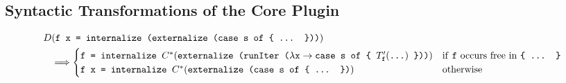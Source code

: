 \documentclass[sigplan,anonymous,review]{acmart}
\newcommand{\expr}[1]{(#1)} %
\newcommand{\rarr}{\rightarrow}
\newcommand{\rewrites}{\Longrightarrow}
\newcommand{\tdots}{\ttt{...}}
\newcommand{\exprdots}{\expr{\tdots}}
\newcommand{\ttt}{\texttt}
\newenvironment{todo}
  {\begin{tcolorbox}
   \textbf{TODO}:
  }
  {\end{tcolorbox}
  }
\begin{document}
\clearpage
\subsection{Syntactic Transformations of the Core Plugin}


\begin{align*}
  D&\expr{\ttt{f x = internalize (externalize (case s of \{ ... \}))}}\\
      &\rewrites \begin{cases}
        \ttt{f = internalize $C^{*}\expr{\ttt{externalize (runIter ($\lambda \ttt{x} \rarr \ttt{case s of \{ $T'_{\ttt{f}}\exprdots$}$ \}))}}$} & \text{if \ttt{f} occurs free in \ttt{\{ ... \}}}\\
        \ttt{f x = internalize $C^{*}\expr{\ttt{externalize (case s of \{ ... \})}}$} & \text{otherwise}
      \end{cases}
\end{align*}
\end{document}
